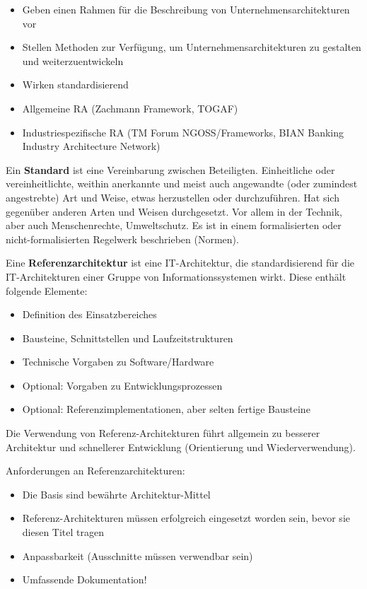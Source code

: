 \begin{itemize}
	\item Geben einen Rahmen für die Beschreibung von Unternehmensarchitekturen vor
	\item Stellen Methoden zur Verfügung, um Unternehmensarchitekturen zu gestalten und weiterzuentwickeln
	\item Wirken standardisierend
	\item Allgemeine RA (Zachmann Framework, TOGAF)
	\item Industriespezifische RA (TM Forum NGOSS/Frameworks, BIAN Banking Industry Architecture Network)
\end{itemize}

Ein \textbf{Standard} ist eine Vereinbarung zwischen Beteiligten. Einheitliche oder vereinheitlichte, weithin anerkannte und meist auch angewandte (oder zumindest angestrebte) Art und Weise, etwas herzustellen oder durchzuführen. Hat sich gegenüber anderen Arten und Weisen durchgesetzt. Vor allem in der Technik, aber auch Menschenrechte, Umweltschutz. Es ist in einem formalisierten oder nicht-formalisierten Regelwerk beschrieben (Normen).

Eine \textbf{Referenzarchitektur} ist eine IT-Architektur, die standardisierend für die IT-Architekturen einer Gruppe von Informationssystemen wirkt. Diese enthält folgende Elemente:
\begin{itemize}
	\item Definition des Einsatzbereiches
	\item Bausteine, Schnittstellen und Laufzeitstrukturen
	\item Technische Vorgaben zu Software/Hardware
	\item Optional: Vorgaben zu Entwicklungsprozessen
	\item Optional: Referenzimplementationen, aber selten fertige Bausteine
\end{itemize}

Die Verwendung von Referenz-Architekturen führt allgemein zu besserer Architektur und schnellerer Entwicklung (Orientierung und Wiederverwendung). 

Anforderungen an Referenzarchitekturen:
\begin{itemize}
	\item Die Basis sind bewährte Architektur-Mittel
	\item Referenz-Architekturen müssen erfolgreich eingesetzt worden sein, bevor sie diesen Titel tragen
	\item Anpassbarkeit (Ausschnitte müssen verwendbar sein)
	\item Umfassende Dokumentation!
\end{itemize}


